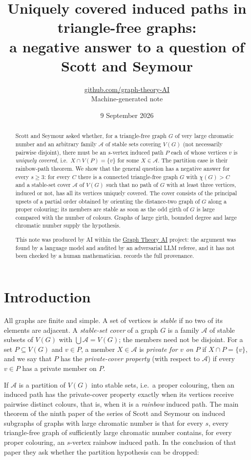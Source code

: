\documentclass[11pt,a4paper]{article}
\title{Uniquely covered induced paths in triangle-free graphs:\\ a negative answer to a question of Scott and Seymour}
\author{\href{https://github.com/graph-theory-AI}{github.com/graph-theory-AI}\\[2pt] \normalsize Machine-generated note}
\date{9 September 2026}
\theoremstyle{plain}
\theoremstyle{definition}
\theoremstyle{remark}
\newcommand{\cA}{\mathcal A}
\begin{document}
\maketitle


\begin{abstract}
Scott and Seymour asked whether, for a triangle-free graph $G$ of very large chromatic number and an arbitrary family $\cA$ of stable sets covering $V(G)$ (not necessarily pairwise disjoint), there must be an $s$-vertex induced path $P$ each of whose vertices $v$ is \emph{uniquely covered}, i.e.\ $X\cap V(P)=\{v\}$ for some $X\in\cA$. The partition case is their rainbow-path theorem. We show that the general question has a negative answer for every $s\ge3$: for every $C$ there is a connected triangle-free graph $G$ with $\chi(G)>C$ and a stable-set cover $\cA$ of $V(G)$ such that no path of $G$ with at least three vertices, induced or not, has all its vertices uniquely covered. The cover consists of the principal upsets of a partial order obtained by orienting the distance-two graph of $G$ along a proper colouring; its members are stable as soon as the odd girth of $G$ is large compared with the number of colours. Graphs of large girth, bounded degree and large chromatic number supply the hypothesis.

\medskip\noindent\small
This note was produced by AI within the \href{https://github.com/graph-theory-AI/Graph-Theory-LLM-Proofs}{Graph Theory AI} project:
the argument was found by a language model and audited by an adversarial LLM
referee, and it has not been checked by a human mathematician.
 records the full provenance.

\end{abstract}

\section{Introduction}

All graphs are finite and simple. A set of vertices is \emph{stable} if no two of its elements are adjacent. A \emph{stable-set cover} of a graph $G$ is a family $\cA$ of stable subsets of $V(G)$ with $\bigcup\cA=V(G)$; the members need not be disjoint. For a set $P\subseteq V(G)$ and $v\in P$, a member $X\in\cA$ is \emph{private for $v$ on $P$} if $X\cap P=\{v\}$, and we say that $P$ has the \emph{private-cover property} (with respect to $\cA$) if every $v\in P$ has a private member on $P$.

If $\cA$ is a partition of $V(G)$ into stable sets, i.e.\ a proper colouring, then an induced path has the private-cover property exactly when its vertices receive pairwise distinct colours, that is, when it is a \emph{rainbow} induced path. The main theorem of the ninth paper of the series of Scott and Seymour on induced subgraphs of graphs with large chromatic number \cite{SS17} is that for every $s$, every triangle-free graph of sufficiently large chromatic number contains, for every proper colouring, an $s$-vertex rainbow induced path. In the conclusion of that paper they ask whether the partition hypothesis can be dropped:
\end{document}
